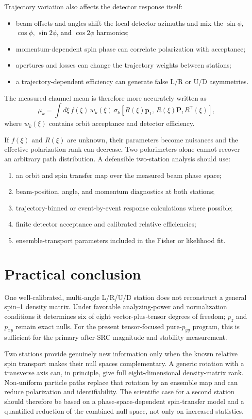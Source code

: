 \documentclass[11pt,a4paper]{article}
\newcommand{\vect}[1]{\bm{#1}}
\newcommand{\Tens}{\bm P}
\begin{document}
Trajectory variation also affects the detector response itself:
\begin{itemize}
 \item beam offsets and angles shift the local detector azimuths and mix the
 $\sin\phi$, $\cos\phi$, $\sin2\phi$, and $\cos2\phi$ harmonics;
 \item momentum-dependent spin phase can correlate polarization with acceptance;
 \item apertures and losses can change the trajectory weights between stations;
 \item a trajectory-dependent efficiency can generate false L/R or U/D
 asymmetries.
\end{itemize}
The measured channel mean is therefore more accurately written as
\begin{equation}
 \mu_k=\int d\xi\,f(\xi)\,w_k(\xi)\,
 \sigma_k\!\left[R(\xi)\vect p_1,\,R(\xi)\Tens_1R^{\mathsf T}(\xi)\right],
\end{equation}
where $w_k(\xi)$ contains orbit acceptance and detector efficiency.

If $f(\xi)$ and $R(\xi)$ are unknown, their parameters become nuisances and the
effective polarization rank can decrease.  Two polarimeters alone cannot recover
an arbitrary path distribution.  A defensible two-station analysis should use:
\begin{enumerate}
 \item an orbit and spin transfer map over the measured beam phase space;
 \item beam-position, angle, and momentum diagnostics at both stations;
 \item trajectory-binned or event-by-event response calculations where possible;
 \item finite detector acceptance and calibrated relative efficiencies;
 \item ensemble-transport parameters included in the Fisher or likelihood fit.
\end{enumerate}

\section{Practical conclusion}

One well-calibrated, multi-angle L/R/U/D station does not reconstruct a general
spin--1 density matrix.  Under favorable analyzing-power and normalization
conditions it determines six of eight vector-plus-tensor degrees of freedom;
$p_z$ and $p_{xy}$ remain exact nulls.  For the present tensor-focused pure-$p_{yy}$
program, this is sufficient for the primary after-SRC magnitude and stability
measurement.

Two stations provide genuinely new information only when the known relative
spin transport makes their null spaces complementary.  A generic rotation with
a transverse axis can, in principle, give full eight-dimensional density-matrix
rank.  Non-uniform particle paths replace that rotation by an ensemble map and
can reduce polarization and identifiability.  The scientific case for a second
station should therefore be based on a phase-space-dependent spin-transfer model
and a quantified reduction of the combined null space, not only on increased
statistics.
\end{document}
